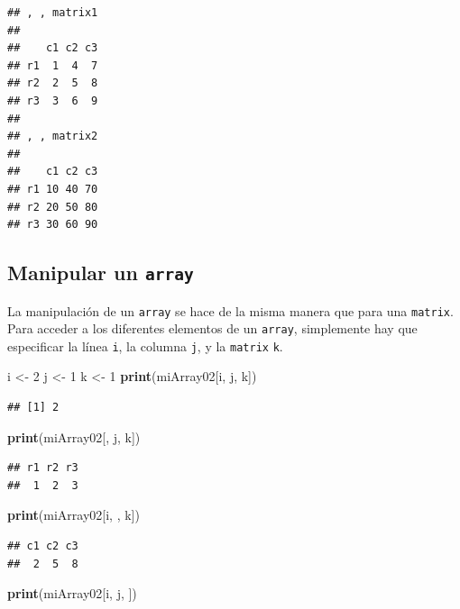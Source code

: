 \documentclass[
]{book}
\newenvironment{Shaded}{\begin{snugshade}}{\end{snugshade}}
\newcommand{\DecValTok}[1]{\textcolor[rgb]{0.00,0.00,0.81}{#1}}
\newcommand{\KeywordTok}[1]{\textcolor[rgb]{0.13,0.29,0.53}{\textbf{#1}}}
\newcommand{\NormalTok}[1]{#1}
\newcommand{\StringTok}[1]{\textcolor[rgb]{0.31,0.60,0.02}{#1}}
\begin{document}
\begin{verbatim}
## , , matrix1
## 
##    c1 c2 c3
## r1  1  4  7
## r2  2  5  8
## r3  3  6  9
## 
## , , matrix2
## 
##    c1 c2 c3
## r1 10 40 70
## r2 20 50 80
## r3 30 60 90
\end{verbatim}

\hypertarget{manipular-un-array}{%
\subsection{\texorpdfstring{Manipular un \texttt{array}}{Manipular un array}}\label{manipular-un-array}}

La manipulación de un \texttt{array} se hace de la misma manera que para una \texttt{matrix}. Para acceder a los diferentes elementos de un \texttt{array}, simplemente hay que especificar la línea \texttt{i}, la columna \texttt{j}, y la \texttt{matrix} \texttt{k}.

\begin{Shaded}
\begin{Highlighting}[]
\NormalTok{i <-}\StringTok{ }\DecValTok{2}
\NormalTok{j <-}\StringTok{ }\DecValTok{1}
\NormalTok{k <-}\StringTok{ }\DecValTok{1}
\KeywordTok{print}\NormalTok{(miArray02[i, j, k])}
\end{Highlighting}
\end{Shaded}

\begin{verbatim}
## [1] 2
\end{verbatim}

\begin{Shaded}
\begin{Highlighting}[]
\KeywordTok{print}\NormalTok{(miArray02[, j, k])}
\end{Highlighting}
\end{Shaded}

\begin{verbatim}
## r1 r2 r3 
##  1  2  3
\end{verbatim}

\begin{Shaded}
\begin{Highlighting}[]
\KeywordTok{print}\NormalTok{(miArray02[i, , k])}
\end{Highlighting}
\end{Shaded}

\begin{verbatim}
## c1 c2 c3 
##  2  5  8
\end{verbatim}

\begin{Shaded}
\begin{Highlighting}[]
\KeywordTok{print}\NormalTok{(miArray02[i, j, ])}
\end{Highlighting}
\end{Shaded}
\end{document}

